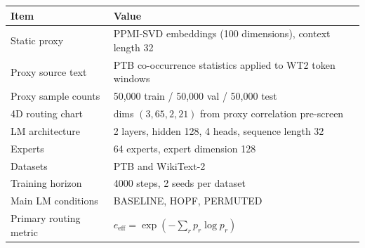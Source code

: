 \begin{tabular}{ll}
\toprule
Item & Value \\
\midrule
Static proxy & PPMI-SVD embeddings (100 dimensions), context length 32 \\
Proxy source text & PTB co-occurrence statistics applied to WT2 token windows \\
Proxy sample counts & 50{,}000 train / 50{,}000 val / 50{,}000 test \\
4D routing chart & dims $(3,65,2,21)$ from proxy correlation pre-screen \\
LM architecture & 2 layers, hidden 128, 4 heads, sequence length 32 \\
Experts & 64 experts, expert dimension 128 \\
Datasets & PTB and WikiText-2 \\
Training horizon & 4000 steps, 2 seeds per dataset \\
Main LM conditions & BASELINE, HOPF, PERMUTED \\
Primary routing metric & $e_{\mathrm{eff}} = \exp(-\sum_r p_r \log p_r)$ \\
\bottomrule
\end{tabular}
